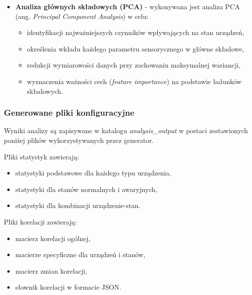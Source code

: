 \begin{itemize}
    \item \textbf{Analiza głównych składowych (PCA)} - wykonywana jest analiza PCA (ang. \textit{Principal Component Analysis}) \cite{jolliffe_pca} w celu:
    
\begin{itemize}
    \item identyfikacji najważniejszych czynników wpływających na stan urządzeń,
    \item określenia wkładu każdego parametru sensorycznego w główne składowe,
    \item redukcji wymiarowości danych przy zachowaniu maksymalnej wariancji,
    \item wyznaczenia ważności cech (\textit{feature importance}) na podstawie ładunków składowych.
\end{itemize}

\end{itemize}

\newpage

\subsubsection{Generowane pliki konfiguracyjne}

Wyniki analizy są zapisywane w katalogu \textit{analysis\_output} w postaci zestawionych poniżej plików wykorzystywanych przez generator.

\vspace{0.3em}

Pliki statystyk zawierają:
\begin{itemize}
    \item statystyki podstawowe dla każdego typu urządzenia,
    \item statystyki dla stanów normalnych i awaryjnych,
    \item statystyki dla kombinacji urządzenie-stan.
\end{itemize}

\vspace{0.3em}

Pliki korelacji zawierają:
\begin{itemize}
    \item macierz korelacji ogólnej,
    \item macierze specyficzne dla urządzeń i stanów,
    \item macierz zmian korelacji,
    \item słownik korelacji w formacie JSON.
\end{itemize}

